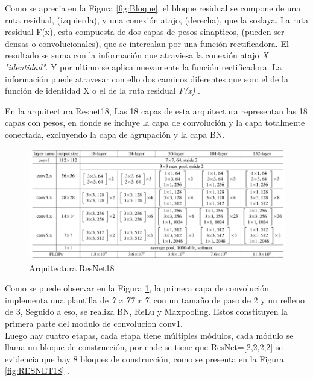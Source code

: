				Como se aprecia en la Figura \ref{fig:Bloque}, el bloque residual se compone de una ruta residual, (izquierda), y una conexión atajo, (derecha), que la soslaya. La ruta residual F(x), esta compuesta de dos capas de pesos sinapticos, (pueden ser densas o convolucionales), que se intercalan por una función rectificadora. El resultado se suma con la información que atraviesa la conexión atajo \textit{X "identidad"}. Y por ultimo se aplica nuevamente la función rectificadora. La información puede atravesar con ello dos caminos diferentes que son: el de la función de identidad X o el de la ruta residual \textit{F(x)} \cite{ref_5}.

				\newpage
				En la arquitectura Resnet18, Las 18 capas de esta arquitectura representan las 18 capas con pesos, en donde se incluye la capa de convolución y la capa totalmente conectada, excluyendo la capa de agrupación y la capa BN.
				
				\begin{figure}[ht]
					\centering
					\includegraphics[scale=0.65]{Figs/68.png}
					\caption{Arquitectura ResNet18}
					\label{fig:ArqRes18}
				\end{figure}
				

				Como se puede observar en la Figura \ref{fig:ArqRes18}, la primera capa de convolución implementa una plantilla de \textit{7 x 77 x 7}, con un tamaño de paso de 2 y un relleno de 3, Seguido a eso, se realiza BN, ReLu y Maxpooling. Estos constituyen la primera parte del modulo de convolucion conv1.\\
					
				Luego hay cuatro etapas, cada etapa tiene múltiples módulos, cada módulo se llama un bloque de construcción, por ende se tiene que ResNet=[2,2,2,2] se evidencia que hay 8 bloques de construcción, como se presenta en la Figura \ref{fig:RESNET18} \cite{ref_5}.				
		
